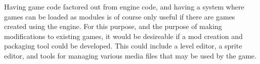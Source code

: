  	Having game code factored out from engine code, and having a system where games can be loaded as modules is of course only useful if there are games created using the engine. For this purpose, and the purpose of making modifications to existing games, it would be desireable if a mod creation and packaging tool could be developed.
 	This could include a level editor, a sprite editor, and tools for managing various media files that may be used by the game.
	